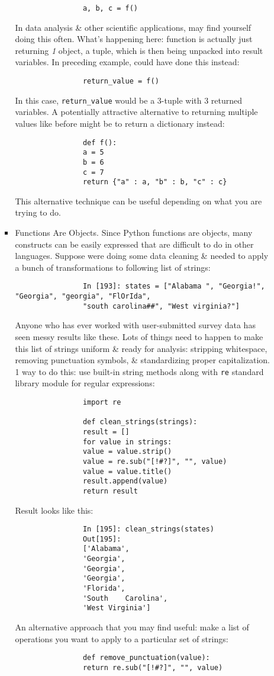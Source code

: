 \documentclass{article}
\begin{document}
\begin{itemize}
\begin{itemize}
\begin{itemize}
\begin{verbatim}
				a, b, c = f()
			\end{verbatim}
			In data analysis \& other scientific applications, may find yourself doing this often. What's happening here: function is actually just returning {\it1} object, a tuple, which is then being unpacked into result variables. In preceding example, could have done this instead:
			\begin{verbatim}
				return_value = f()
			\end{verbatim}
			In this case, \verb|return_value| would be a 3-tuple with 3 returned variables. A potentially attractive alternative to returning multiple values like before might be to return a dictionary instead:
			\begin{verbatim}
				def f():
				a = 5
				b = 6
				c = 7
				return {"a" : a, "b" : b, "c" : c}
			\end{verbatim}
			This alternative technique can be useful depending on what you are trying to do.
			\item {\sf Functions Are Objects.} Since Python functions are objects, many constructs can be easily expressed that are difficult to do in other languages. Suppose were doing some data cleaning \& needed to apply a bunch of transformations to following list of strings:
			\begin{verbatim}
				In [193]: states = ["Alabama ", "Georgia!", "Georgia", "georgia", "FlOrIda",
				"south carolina##", "West virginia?"]
			\end{verbatim}
			Anyone who has ever worked with user-submitted survey data has seen messy results like these. Lots of things need to happen to make this list of strings uniform \& ready for analysis: stripping whitespace, removing punctuation symbols, \& standardizing proper capitalization. 1 way to do this: use built-in string methods along with {\tt re} standard library module for regular expressions:
			\begin{verbatim}
				import re
				
				def clean_strings(strings):
				result = []
				for value in strings:
				value = value.strip()
				value = re.sub("[!#?]", "", value)
				value = value.title()
				result.append(value)
				return result
			\end{verbatim}
			Result looks like this:
			\begin{verbatim}
				In [195]: clean_strings(states)
				Out[195]:
				['Alabama',
				'Georgia',
				'Georgia',
				'Georgia',
				'Florida',
				'South    Carolina',
				'West Virginia']
			\end{verbatim}
			An alternative approach that you may find useful: make a list of operations you want to apply to a particular set of strings:
			\begin{verbatim}
				def remove_punctuation(value):
				return re.sub("[!#?]", "", value)
				

\end{verbatim}
\end{itemize}
\end{itemize}
\end{itemize}
\end{document}
